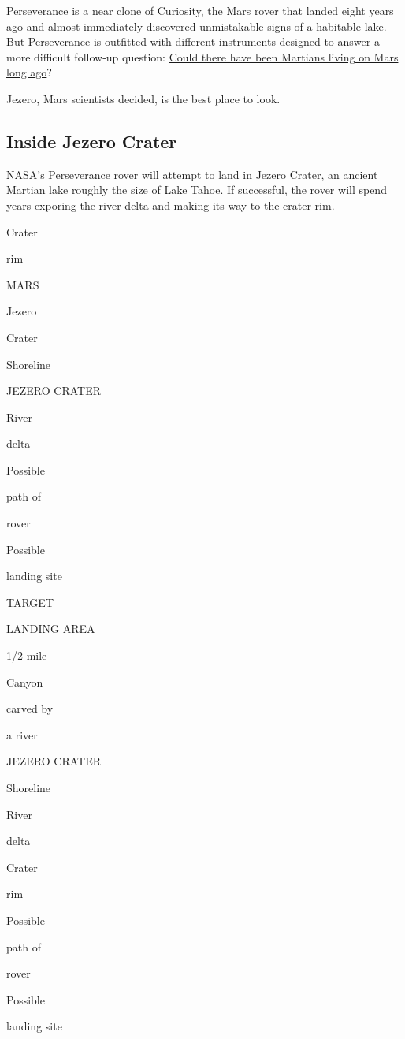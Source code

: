 Perseverance is a near clone of Curiosity, the Mars rover that landed
eight years ago and almost immediately discovered unmistakable signs of
a habitable lake. But Perseverance is outfitted with different
instruments designed to answer a more difficult follow-up question:
\href{https://www.nytimes3xbfgragh.onion/2020/07/24/science/mars-life-water.html}{Could
there have been Martians living on Mars long ago}?

Jezero, Mars scientists decided, is the best place to look.

\hypertarget{inside-jezero-crater}{%
\subsection{Inside Jezero Crater}\label{inside-jezero-crater}}

NASA's Perseverance rover will attempt to land in Jezero Crater, an
ancient Martian lake roughly the size of Lake Tahoe. If successful, the
rover will spend years exporing the river delta and making its way to
the crater rim.

Crater

rim

MARS

Jezero

Crater

Shoreline

JEZERO CRATER

River

delta

Possible

path of

rover

Possible

landing site

TARGET

LANDING AREA

1/2 mile

Canyon

carved by

a river

JEZERO CRATER

Shoreline

River

delta

Crater

rim

Possible

path of

rover

Possible

landing site

